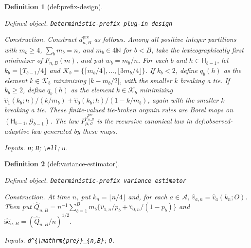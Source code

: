 \documentclass{article}
\newtheorem{definition}{Definition}
\begin{document}
\begin{definition}[def:prefix-design]\label{def:prefix-design}
\par\smallskip\noindent\emph{Defined object.} \texttt{Deterministic-\allowbreak{}prefix plug-\allowbreak{}in design}
\par\smallskip\noindent\emph{Construction.} Construct \(d^{\mathrm{pre}}_{n,B}\) as follows. Among all positive integer partitions with \(m_b\ge4\), \(\sum_bm_b=n\), and \(m_b\in4\mathbb N\) for \(b<B\), take the lexicographically first minimizer of \(F_{n,B}(m)\), and put \(w_b=m_b/n\). For each \(b\) and \(h\in\mathsf H_{b-1}\), let \(k_b=\lfloor T_{b-1}/4\rfloor\) and \(\mathcal K_b=\{\lceil m_b/4\rceil,\ldots,\lfloor3m_b/4\rfloor\}\). If \(k_b<2\), define \(q_b(h)\) as the element \(k\in\mathcal K_b\) minimizing \(|k-m_b/2|\), with the smaller \(k\) breaking a tie. If \(k_b\ge2\), define \(q_b(h)\) as the element \(k\in\mathcal K_b\) minimizing \(\widehat v_1(k_b;h)/(k/m_b)+\widehat v_0(k_b;h)/(1-k/m_b)\), again with the smaller \(k\) breaking a tie. These finite-valued tie-broken argmin rules are Borel maps on \((\mathsf H_{b-1},\mathcal G_{b-1})\). The law \(P^{d^{\mathrm{pre}}_{n,B}}_{\mu,\sigma}\) is the recursive canonical law in def:observed-adaptive-law generated by these maps.
\par\smallskip\noindent\emph{Inputs.} \texttt{n}; \texttt{B}; \texttt{\textbackslash{}\allowbreak{}ell}; \texttt{u}.
\end{definition}

\begin{definition}[def:variance-estimator]\label{def:variance-estimator}
\par\smallskip\noindent\emph{Defined object.} \texttt{Deterministic-\allowbreak{}prefix variance estimator}
\par\smallskip\noindent\emph{Construction.} At time \(n\), put \(k_n=\lfloor n/4\rfloor\) and, for each \(a\in\mathcal A\), \(\widehat v_{a,n}=\widehat v_a(k_n;O)\). Then put \(\widehat Q_{n,B}=n^{-1}\sum_{b=1}^Bm_b\{\widehat v_{1,n}/p_b+\widehat v_{0,n}/(1-p_b)\}\) and \(\widehat{\mathrm{se}}_{n,B}=(\widehat Q_{n,B}/n)^{1/2}\).
\par\smallskip\noindent\emph{Inputs.} \texttt{d\textasciicircum{}\{\textbackslash{}\allowbreak{}mathrm\{pre\}\allowbreak{}\}\allowbreak{}\_\allowbreak{}\{n,\allowbreak{}B\}\allowbreak{}}; \texttt{O}.
\end{definition}
\end{document}
